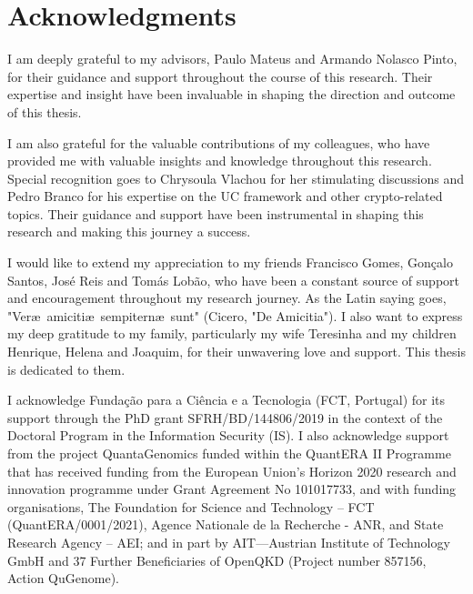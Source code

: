 

\chapter*{Acknowledgments}

I am deeply grateful to my advisors, Paulo Mateus and Armando Nolasco Pinto, for their guidance and support throughout the course of this research. Their expertise and insight have been invaluable in shaping the direction and outcome of this thesis.

I am also grateful for the valuable contributions of my colleagues, who have provided me with valuable insights and knowledge throughout this research. Special recognition goes to Chrysoula Vlachou for her stimulating discussions and Pedro Branco for his expertise on the UC framework and other crypto-related topics. Their guidance and support have been instrumental in shaping this research and making this journey a success.

I would like to extend my appreciation to my friends Francisco Gomes, Gonçalo Santos, José Reis and Tomás Lobão, who have been a constant source of support and encouragement throughout my research journey. As the Latin saying goes, "Ver\ae\ amiciti\ae\ sempitern\ae\ sunt" (Cicero, "De Amicitia"). I also want to express my deep gratitude to my family, particularly my wife Teresinha and my children Henrique, Helena and Joaquim, for their unwavering love and support. This thesis is dedicated to them.

\vfill
\begin{center}\begin{footnotesize}
I acknowledge Funda\c{c}\~{a}o para a Ci\^{e}ncia e a Tecnologia (FCT, Portugal) for its support through the PhD grant SFRH/BD/144806/2019 in the context of the Doctoral Program in the Information Security (IS). I also acknowledge support from the project QuantaGenomics funded within the QuantERA II Programme that has received funding from the European Union’s Horizon 2020 research and innovation programme under Grant Agreement No 101017733, and with funding organisations, The Foundation for Science and Technology – FCT (QuantERA/0001/2021), Agence Nationale de la Recherche - ANR, and State Research Agency – AEI; and in part by AIT—Austrian Institute of Technology GmbH and 37 Further Beneficiaries of OpenQKD (Project number 857156, Action QuGenome).

\end{footnotesize}
\end{center}

